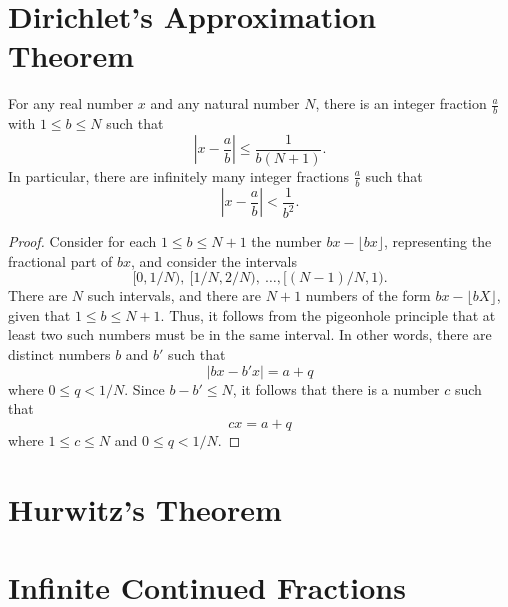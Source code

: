 \section{Dirichlet's Approximation Theorem}

\begin{theorem}\label{theorem:dirichlets-approximation-theorem}
  For any real number $x$ and any natural number $N$, there is an integer fraction $\frac{a}{b}$ with $1\leq b\leq N$ such that
  \begin{equation*}
    \left|x-\frac{a}{b}\right|\leq \frac{1}{b(N+1)}.
  \end{equation*}
  In particular, there are infinitely many integer fractions $\frac{a}{b}$ such that
  \begin{equation*}
    \left|x-\frac{a}{b}\right|<\frac{1}{b^2}.
  \end{equation*}
\end{theorem}

\begin{proof}
  Consider for each $1\leq b \leq N+1$ the number $bx-\lfloor bx\rfloor$, representing the fractional part of $bx$, and consider the intervals
  \begin{equation*}
    [0,1/N),~[1/N,2/N),~\ldots,[(N-1)/N,1).
  \end{equation*}
  There are $N$ such intervals, and there are $N+1$ numbers of the form $bx-\lfloor bX\rfloor$, given that $1\leq b\leq N+1$. Thus, it follows from the pigeonhole principle that at least two such numbers must be in the same interval. In other words, there are distinct numbers $b$ and $b'$ such that
  \begin{equation*}
    |bx-b'x| = a + q
  \end{equation*}
  where $0\leq q<1/N$. Since $b-b'\leq N$, it follows that there is a number $c$ such that
  \begin{equation*}
    cx = a+q
  \end{equation*}
  where $1\leq c\leq N$ and $0\leq q<1/N$.
\end{proof}

\section{Hurwitz's Theorem}

\section{Infinite Continued Fractions}

